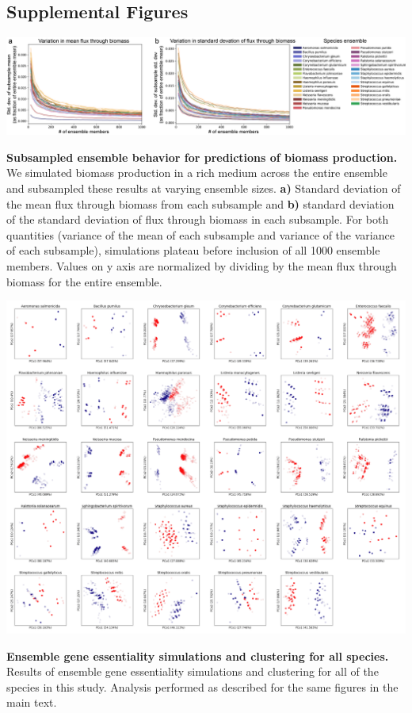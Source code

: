 \documentclass[11pt,twocolumn,notitlepage,openany,twoside]{book}
\begin{document}
\begin{refsection}
\printbibliography[heading=none]

\section{Supplemental Figures}

\begin{suppfigure*}
\centering
\includegraphics[width=\textwidth]{ch3_figS1}
\caption[ Subsampled ensemble behavior for predictions of biomass production.]{\textbf{ Subsampled ensemble behavior for predictions of biomass production.} We simulated biomass production in a rich medium across the entire ensemble and subsampled these results at varying ensemble sizes. \textbf{a)} Standard deviation of the mean flux through biomass from each subsample and \textbf{b)} standard deviation of the standard deviation of flux through biomass in each subsample. For both quantities (variance of the mean of each subsample and variance of the variance of each subsample), simulations plateau before inclusion of all 1000 ensemble members. Values on y axis are normalized by dividing by the mean flux through biomass for the entire ensemble.}
\end{suppfigure*}

\begin{suppfigure*}
\centering
\includegraphics[width=\textwidth]{ch3_figS2}
\caption[ Ensemble gene essentiality simulations and clustering for all species.]{\textbf{Ensemble gene essentiality simulations and clustering for all species.} Results of ensemble gene essentiality simulations and clustering for all of the species in this study. Analysis performed as described for the same figures in the main text.}
\end{suppfigure*}

\end{refsection}
\end{document}
